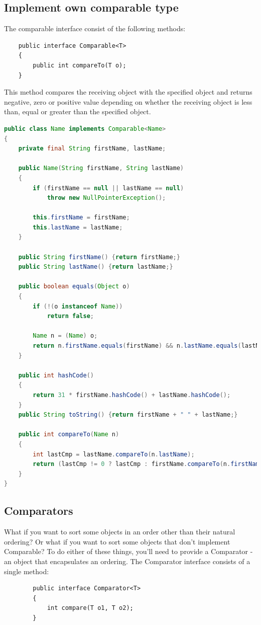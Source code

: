 \documentclass[10 pt]{book}
\begin{document}
\subsection{Implement own comparable type}
The comparable interface consist of the following methods:
\begin{lstlisting}
	public interface Comparable<T>
	{
		public int compareTo(T o);
	}
\end{lstlisting}

This method compares the receiving object with the specified object and returns negative, zero or positive value depending on whether the receiving object is less than, equal or greater than the specified object.
\begin{lstlisting}[language = java, backgroundcolor = \color{white}]
public class Name implements Comparable<Name>
{
    private final String firstName, lastName;

    public Name(String firstName, String lastName)
    {
        if (firstName == null || lastName == null)
            throw new NullPointerException();

        this.firstName = firstName;
        this.lastName = lastName;
    }

    public String firstName() {return firstName;}
    public String lastName() {return lastName;}

    public boolean equals(Object o)
    {
        if (!(o instanceof Name))
            return false;

        Name n = (Name) o;
        return n.firstName.equals(firstName) && n.lastName.equals(lastName);
    }

    public int hashCode()
    {
    	return 31 * firstName.hashCode() + lastName.hashCode();
    }
    public String toString() {return firstName + " " + lastName;}

    public int compareTo(Name n)
    {
        int lastCmp = lastName.compareTo(n.lastName);
        return (lastCmp != 0 ? lastCmp : firstName.compareTo(n.firstName));
    }
}
\end{lstlisting}

\subsection{Comparators}
What if you want to sort some objects in an order other than their natural ordering? Or what if you want to sort some objects that don't implement Comparable? To do either of these things, you'll need to provide a Comparator - an object that encapsulates an ordering. The Comparator interface consists of a single method:
	\begin{lstlisting}
		public interface Comparator<T>
		{
			int compare(T o1, T o2);
		}
	\end{lstlisting}
\end{document}
